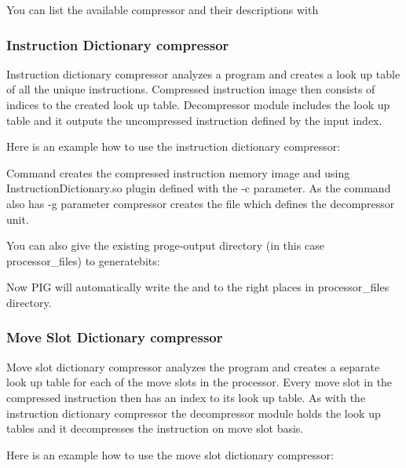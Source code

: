 \documentclass[twoside]{tceusermanual}
\begin{document}
You can list the available compressor and their descriptions with


\subsubsection{Instruction Dictionary compressor}

Instruction dictionary compressor analyzes a program and creates a look up table
of all the unique instructions. Compressed instruction image then consists of
indices to the created look up table. Decompressor module includes the look up
table and it outputs the uncompressed instruction defined by the input index.

Here is an example how to use the instruction dictionary compressor:


Command creates the compressed instruction memory image  and
 using InstructionDictionary.so plugin defined with the
-c parameter. As the command also has -g parameter compressor creates the
 file which defines the decompressor unit.

You can also give the existing proge-output directory (in this case
processor\_files) to generatebits:


Now PIG will automatically write the  and
 to the right places in processor\_files directory.

\subsubsection{Move Slot Dictionary compressor}

Move slot dictionary compressor analyzes the program and creates a separate
look up table for each of the move slots in the processor. Every move slot in
the compressed instruction then has an index to its look up table. As with the
instruction dictionary compressor the decompressor module holds the look up
tables and it decompresses the instruction on move slot basis.

Here is an example how to use the move slot dictionary compressor:
\end{document}
